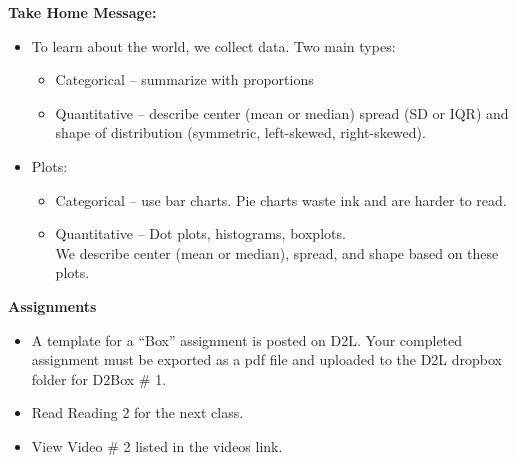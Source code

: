 \begin{center}
  {\bf Take Home Message:}
\end{center}
\begin{itemize}
\item To learn about the world, we collect data. Two main types:
  \begin{itemize}
  \item Categorical -- summarize with proportions
  \item Quantitative -- describe center (mean or median) spread (SD
    or IQR) and shape of distribution (symmetric, left-skewed,
    right-skewed). 
  \end{itemize}
\item Plots:
  \begin{itemize}
  \item Categorical -- use bar charts. Pie charts waste ink and are
    harder to read.
  \item Quantitative -- Dot plots, histograms, boxplots.\\
    We describe center (mean or median), spread, and shape based on
    these plots.
  \end{itemize}
\end{itemize} \vfill



{\bf Assignments}
\begin{itemize}
\item %
   A template for a ``Box'' assignment is posted on D2L.
  Your completed assignment must be exported as a pdf file and uploaded
  to the D2L dropbox folder  for D2Box \# 1.
\item Read Reading 2 for the next class.
\item View Video \# 2 listed in the videos link. 
\end{itemize}

